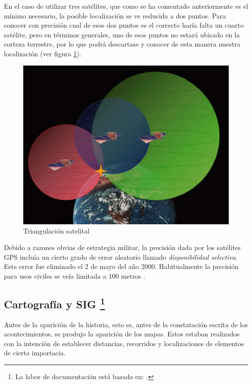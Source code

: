 En el caso de utilizar tres satélites, que como se ha comentado anteriormente es el mínimo necesario, la posible localización se ve reducida a dos puntos. Para conocer con precisión cual de esos dos puntos es el correcto haría falta un cuarto satélite, pero en términos generales, uno de esos puntos no estará ubicado en la corteza terrestre, por lo que podrá descartase y conocer de esta manera nuestra localización (ver figura \ref{fig:triangulacion-satelital}).

\begin{figure}[h!btp]
\centering
\includegraphics[scale=0.5, fbox={\fboxrule} 0mm]{images/03-antecedentes/31-funcionamiento_gps.jpg}
\caption{Triangulación satelital}
\label{fig:triangulacion-satelital}
\end{figure}

Debido a razones obvias de estrategia militar, la precisión dada por los satélites \ac{GPS} incluía un cierto grado de error aleatorio llamado \textit{disponibilidad selectiva}. Este error fue eliminado el 2 de mayo del año 2000. Habitualmente la precisión para usos civiles se veía limitada a 100 metros \cite{Corr00}.

\subsection{Cartografía y \acs{SIG} \protect\footnote{La labor de documentación está basada en: \cite{Diaz15}.} }

Antes de la aparición de la historia, esto es, antes de la constatación escrita de los acontecimientos, se produjo la aparición de los mapas. Estos estaban realizados con la intención de establecer distancias, recorridos y localizaciones de elementos de cierta importacia.

